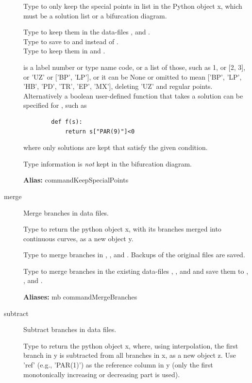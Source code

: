 \documentclass[12pt]{report}
\begin{document}
\begin{description}
    Type  to only keep the special points in list in
    the Python object x, which must be a solution list or a bifurcation diagram.

    Type  to keep them in the data-files
    , and .\\
    Type  to save to  and
     instead of .\\
    Type  to keep them in  and .

     is a label number or type name code, or a list of those,
    such as 1, or [2, 3], or 'UZ' or ['BP', 'LP'], or it can be None or
    omitted to mean ['BP', 'LP', 'HB', 'PD', 'TR', 'EP', 'MX'], deleting 'UZ' and
    regular points.\\
    Alternatively a boolean user-defined function  that
    takes a solution can be specified for , such as
\begin{verbatim}
        def f(s):
            return s["PAR(9)"]<0
\end{verbatim}
    where only solutions are kept that satisfy the given condition.

    Type information is \emph{not} kept in the bifurcation diagram.

\textbf{Alias:} commandKeepSpecialPoints

\item[merge]
Merge branches in data files.

    Type  to return the python object x, with its branches
    merged into continuous curves, as a new object y.

    Type  to merge branches in ,
    , and .  Backups of the
    original files are saved.

    Type  to merge branches in the existing data-files
    , , and  and save them to 
    , , and .

\textbf{Aliases:} mb commandMergeBranches

\item[subtract]
Subtract branches in data files.

    Type  to return the python object x, where,
    using interpolation, the first branch in y is subtracted from all
    branches in x, as a new object z.
    Use 'ref' (e.g., 'PAR(1)')  as the reference column in y
    (only the first monotonically increasing or decreasing part is used).


\end{description}
\end{document}
